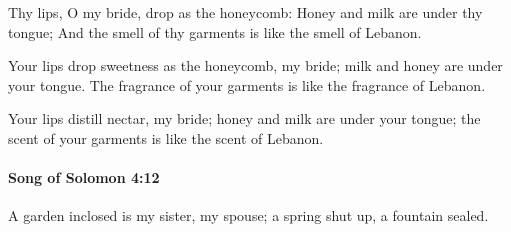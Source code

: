 			\begin{versebox}
					\item[BHS] 
					\item[LXX] 
					\item[ASV] Thy lips, O my bride, drop as the honeycomb: Honey and milk are under thy tongue; And the smell of thy garments is like the smell of Lebanon.
					\item[NIV] Your lips drop sweetness as the honeycomb, my bride; milk and honey are under your tongue. The fragrance of your garments is like the fragrance of Lebanon.
					\item[NRSV] Your lips distill nectar, my bride; honey and milk are under your tongue; the scent of your garments is like the scent of Lebanon.
			\end{versebox}

		\paragraph{Song of Solomon 4:12} %
			\label{SONGOFSOLOMON-4-12}

			A garden inclosed is my sister, my spouse; a spring shut up, a fountain sealed.

